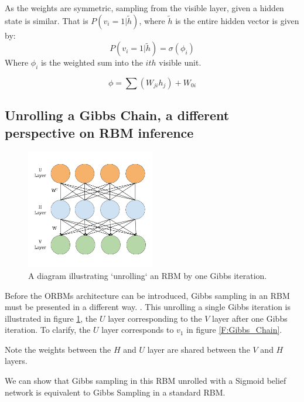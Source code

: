 As the weights are symmetric, sampling from the visible layer, given a hidden state is similar. That is $P(v_i = 1 | \tilde{h})$, where $\tilde{h}$ is the entire hidden vector is given by:
$$ P(v_i = 1 | \tilde{h}) = \sigma(\phi_{i}) $$
Where $\phi_i$ is the weighted sum into the $ith$ visible unit.

$$ \phi = \sum(W_{ji}h_{j}) + W_{0i} $$


\subsection{Unrolling a Gibbs Chain, a different perspective on RBM inference}

\begin{figure}
  \begin{center}
    \includegraphics[width=0.5\textwidth]{Assets/3_Layer_RBM.png}
  \end{center}
  \caption{A diagram illustrating `unrolling` an RBM by one Gibbs iteration.}
  \label{F:3-Layer-RBM}
\end{figure}

Before the ORBMs architecture can be introduced, Gibbs sampling in an RBM must be presented in a different way. . This unrolling a single Gibbs iteration is illustrated in figure \ref{F:3-Layer-RBM}, the $U$ layer corresponding to the $V$ layer after one Gibbs iteration. To clarify, the $U$ layer corresponds to $v_1$ in figure \ref{F:Gibbs_Chain}.

Note the weights between the $H$ and $U$ layer are shared between the $V$ and $H$ layers.


We can show that Gibbs sampling in this RBM unrolled with a Sigmoid belief network is equivalent to Gibbs Sampling in a standard RBM.



